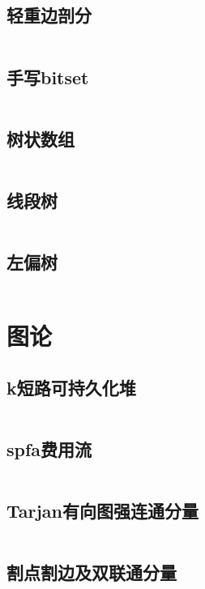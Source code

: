 \documentclass[UTF8]{ctexart}
\begin{document}
\subsection{轻重边剖分}
\inputminted{cpp}{datastructure/轻重边剖分.cpp}

\subsection{手写bitset}
\inputminted{cpp}{datastructure/手写bitset.cpp}

\subsection{树状数组}
\inputminted{cpp}{datastructure/树状数组.cpp}

\subsection{线段树}
\inputminted{cpp}{datastructure/线段树.cpp}

\subsection{左偏树}
\inputminted{cpp}{datastructure/左偏树.cpp}

\section{图论}

\subsection{k短路可持久化堆}
\inputminted{cpp}{graphtheory/k短路可持久化堆.cpp}

\subsection{spfa费用流}
\inputminted{cpp}{graphtheory/spfa费用流.cpp}

\subsection{Tarjan有向图强连通分量}
\inputminted{cpp}{graphtheory/Tarjan有向图强连通分量.cpp}

\subsection{割点割边及双联通分量}
\inputminted{cpp}{graphtheory/割点割边及双联通分量.cpp}
\end{document}

